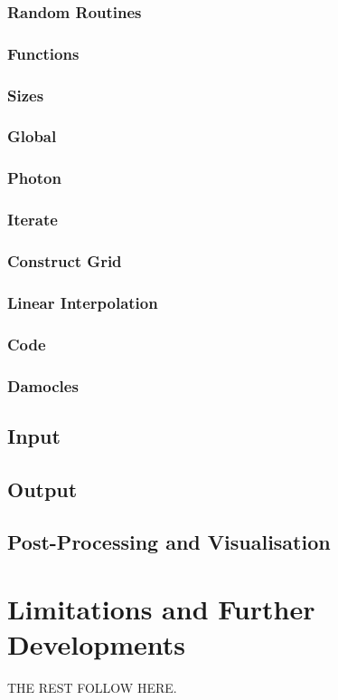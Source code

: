 		\subsubsection{Random Routines}
		\subsubsection{Functions}
		\subsubsection{Sizes}
		\subsubsection{Global}
		\subsubsection{Photon}
		\subsubsection{Iterate}
		\subsubsection{Construct Grid}
		\subsubsection{Linear Interpolation}
		\subsubsection{Code}
		\subsubsection{Damocles}
		
	\subsection{Input}
	\subsection{Output}
	\subsection{Post-Processing and Visualisation}
\section{Limitations and Further Developments}
\label{limitations}

\clearpage
		


THE REST FOLLOW HERE. 


